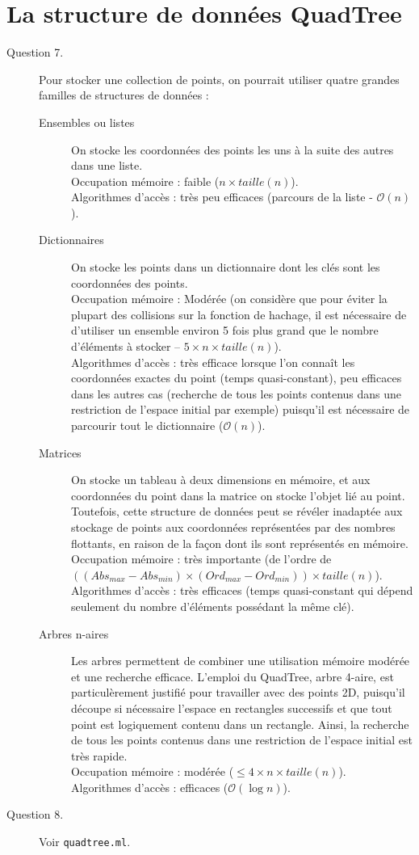 \documentclass[11pt]{scrartcl}
\newcommand{\filename}[1]{\texttt{\textcolor{RawSienna}{#1}}}
\begin{document}
\section{La structure de données QuadTree}

\begin{description}
\item[Question 7.] Pour stocker une collection de points, on pourrait utiliser quatre grandes familles de structures de données :
\begin{description}
\item[Ensembles ou listes] On stocke les coordonnées des points les uns à la suite des autres dans une liste.\\
Occupation mémoire : faible ($n \times taille(n)$).\\
Algorithmes d'accès : très peu efficaces (parcours de la liste - $\mathcal{O}(n)$).
\item[Dictionnaires] On stocke les points dans un dictionnaire dont les clés sont les coordonnées des points.\\
Occupation mémoire : Modérée (on considère que pour éviter la plupart des collisions sur la fonction de hachage, il est nécessaire de d'utiliser un ensemble environ 5 fois plus grand que le nombre d'éléments à stocker -- $5 \times n \times taille(n)$).\\
Algorithmes d'accès : très efficace lorsque l'on connaît les coordonnées exactes du point (temps quasi-constant), peu efficaces dans les autres cas (recherche de tous les points contenus dans une restriction de l'espace initial par exemple) puisqu'il est nécessaire de parcourir tout le dictionnaire ($\mathcal{O}(n)$).
\item[Matrices] On stocke un tableau à deux dimensions en mémoire, et aux coordonnées du point dans la matrice on stocke l'objet lié au point. Toutefois, cette structure de données peut se révéler inadaptée aux stockage de points aux coordonnées représentées par des nombres flottants, en raison de la façon dont ils sont représentés en mémoire.\\
Occupation mémoire : très importante (de l'ordre de $((Abs_{max} - Abs_{min}) \times (Ord_{max} - Ord_{min})) \times taille(n)$).\\
Algorithmes d'accès : très efficaces (temps quasi-constant qui dépend seulement du nombre d'éléments possédant la même clé).
\item[Arbres n-aires] Les arbres permettent de combiner une utilisation mémoire modérée et une recherche efficace. L'emploi du QuadTree, arbre 4-aire, est particulèrement justifié pour travailler avec des points 2D, puisqu'il découpe si nécessaire l'espace en rectangles successifs et que tout point est logiquement contenu dans un rectangle. Ainsi, la recherche de tous les points contenus dans une restriction de l'espace initial est très rapide.\\
Occupation mémoire : modérée ($\leq 4 \times n \times taille(n)$).\\
Algorithmes d'accès : efficaces ($\mathcal{O}(\log{}n)$).
\end{description}
\item[Question 8.] Voir \filename{quadtree.ml}.


\end{description}
\end{document}
